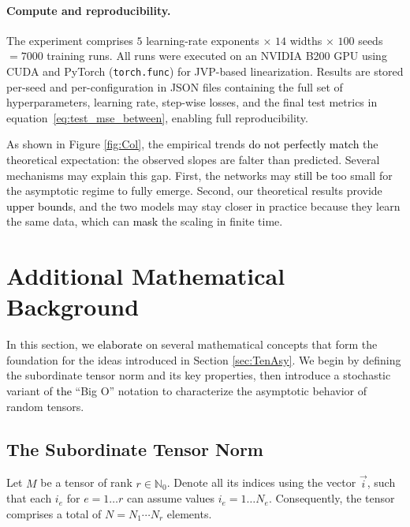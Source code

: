\documentclass{article} %
\def\eqref#1{equation~\ref{#1}}
\begin{document}
\paragraph{Compute and reproducibility.}
The experiment comprises \(5\) learning-rate exponents \(\times\) \(14\) widths \(\times\) \(100\) seeds \(=7000\) training runs. All runs were executed on an NVIDIA B200 GPU using CUDA and PyTorch (\texttt{torch.func}) for JVP-based linearization. Results are stored per-seed and per-configuration in JSON files containing the full set of hyperparameters, learning rate, step-wise losses, and the final test metrics in \eqref{eq:test_mse_between}, enabling full reproducibility.

As shown in Figure \ref{fig:Col}, the empirical trends \textcolor{black}{do not perfectly match} the theoretical expectation: the observed slopes are falter than predicted. Several mechanisms may explain this gap. First, the networks may \textcolor{black}{still be} too small for the asymptotic regime to fully emerge. Second, our theoretical results provide \textcolor{black}{upper bounds}, and the two models may stay closer in practice because they learn the same data, which can \textcolor{black}{mask} the scaling in finite time.



\section{Additional Mathematical Background}

In this section, we \textcolor{black}{elaborate} on several mathematical concepts that form the foundation for the ideas introduced in Section \ref{sec:TenAsy}.
We begin by defining the subordinate tensor norm and its key properties, then introduce a stochastic variant of \textcolor{black}{the} ``Big O'' notation to characterize the asymptotic behavior of random tensors.

\subsection{The Subordinate Tensor Norm}
\label{sec:SubTenNorm}

Let \(M\) be a tensor of rank \(r \in \mathbb{N}_0\). Denote all its indices using the vector \(\vec{i}\), such that each \(i_e\) for \(e=1\ldots r\) can assume values \(i_e=1\ldots N_e\). Consequently, the tensor comprises a total of \(N = N_1 \cdots N_r\) elements. 
\end{document}
